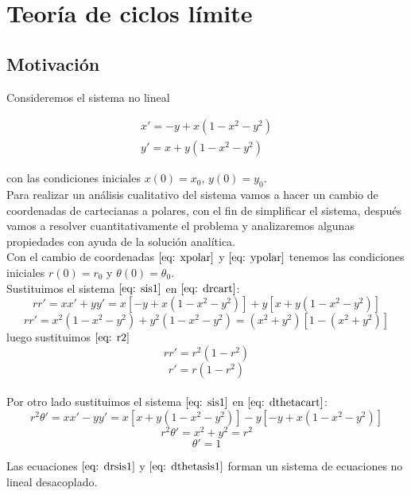 \documentclass[12pt, a4paper]{report}
\begin{document}
\chapter{Teoría de ciclos límite}
\section{Motivación}

Consideremos el sistema no lineal

\begin{equation}\label{eq: sis1}
	\begin{matrix}
		x'=-y+x(1-x^2-y^2) \\
		y'=x+y(1-x^2-y^2)
	\end{matrix}
\end{equation}

con las condiciones iniciales $x(0)=x_0$, $y(0)=y_0$.\\

Para realizar un análisis cualitativo del sistema vamos a hacer un cambio
de coordenadas de cartecianas a polares, con el fin de simplificar
el sistema, después vamos a resolver cuantitativamente el  problema y
analizaremos algunas propiedades con ayuda de la solución analítica.\\

Con el cambio de coordenadas $\eqref{eq: xpolar}$ y  $\eqref{eq: ypolar}$ tenemos
las condiciones iniciales $r(0)=r_0$ y $\theta(0)=\theta_0$.\\

Sustituimos el sistema $\eqref{eq: sis1}$ en $\eqref{eq: drcart}$:
$$rr'=xx'+yy'=x[-y+x(1-x^2-y^2)]+y[x+y(1-x^2-y^2)]$$
$$rr'=x^2(1-x^2-y^2)+y^2(1-x^2-y^2)=(x^2+y^2)[1-(x^2+y^2)]$$
luego sustituimos $\eqref{eq: r2}$
$$rr'=r^2(1-r^2)$$
\begin{equation}\label{eq: drsis1}
	r'=r(1-r^2)
\end{equation}\\

Por otro lado sustituimos el sistema $\eqref{eq: sis1}$ en $\eqref{eq: dthetacart}$:
$$r^2\theta'=xx'-yy'=x[x+y(1-x^2-y^2)]-y[-y+x(1-x^2-y^2)]$$
$$r^2\theta'=x^2+y^2=r^2$$
\begin{equation}\label{eq: dthetasis1}
	\theta'=1
\end{equation}

Las ecuaciones $\eqref{eq: drsis1}$ y $\eqref{eq: dthetasis1}$
forman un sistema de ecuaciones no lineal desacoplado.\\
\end{document}
